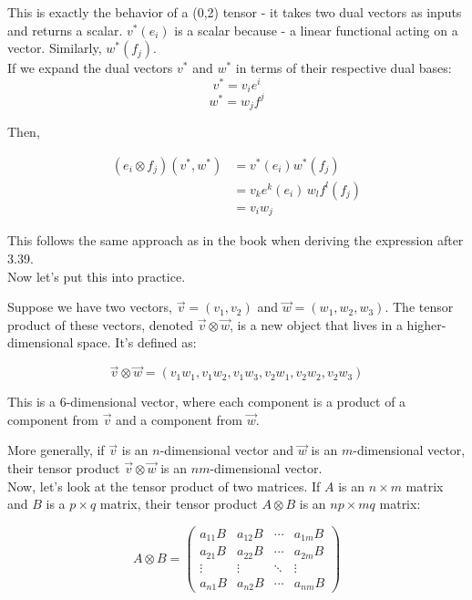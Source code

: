 This is exactly the behavior of a (0,2) tensor - it takes two dual vectors as inputs and returns a scalar.
$v^*(e_i)$ is a scalar because - a linear functional acting on a vector. Similarly,
$w^*(f_j)$.
\\

If we expand the dual vectors $v^*$ and $w^*$ in terms of their respective dual bases:
$$
v^* = v_i e^i
$$
$$
w^* = w_j f^j
$$

Then,

\begin{align*}
(e_i \otimes f_j)(v^*, w^*) &= v^*(e_i) w^*(f_j) \\
&= v_k e^k(e_i) \, w_l f^l(f_j) \\
&= v_i w_j
\end{align*}

This follows the same approach as in the book when deriving the expression after 3.39.
\\






Now let's put this into practice.


Suppose we have two vectors, $\vec{v} = (v_1, v_2)$ and $\vec{w} = (w_1, w_2, w_3)$.
The tensor product of these vectors, denoted $\vec{v} \otimes \vec{w}$,
is a new object that lives in a higher-dimensional space. It's defined as:

$$
\vec{v} \otimes \vec{w} = (v_1 w_1, v_1 w_2, v_1 w_3, v_2 w_1, v_2 w_2, v_2 w_3)
$$

This is a 6-dimensional vector, where each component is a product of a component from
$\vec{v}$ and a component from $\vec{w}$.

More generally, if $\vec{v}$ is an $n$-dimensional vector and $\vec{w}$ is an $m$-dimensional vector,
their tensor product $\vec{v} \otimes \vec{w}$ is an $nm$-dimensional vector.
\\

Now, let's look at the tensor product of two matrices.
If $A$ is an $n \times m$ matrix and $B$ is a $p \times q$ matrix,
their tensor product $A \otimes B$ is an $np \times mq$ matrix:

$$
A \otimes B = 
\begin{pmatrix} 
a_{11}B & a_{12}B & \cdots & a_{1m}B \\
a_{21}B & a_{22}B & \cdots & a_{2m}B \\
\vdots & \vdots & \ddots & \vdots \\
a_{n1}B & a_{n2}B & \cdots & a_{nm}B
\end{pmatrix}
$$

